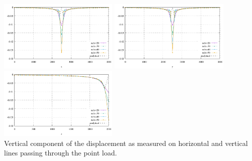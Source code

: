 \begin{center}
\includegraphics[width=5.7cm]{python_codes/fieldstone_123/results/exp2/xprofile_uz.pdf}
\includegraphics[width=5.7cm]{python_codes/fieldstone_123/results/exp2/yprofile_uz.pdf}
\includegraphics[width=5.7cm]{python_codes/fieldstone_123/results/exp2/zprofile_uz.pdf}\\
{\captionfont Vertical component of the displacement as measured on horizontal and 
vertical lines passing through the point load.}
\end{center}



